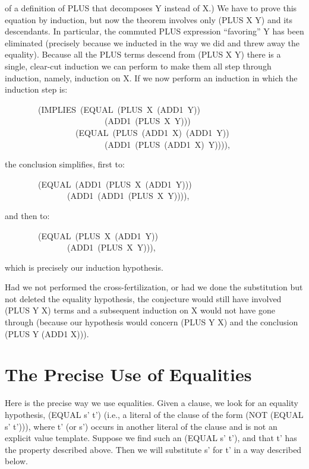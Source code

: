 \documentclass[11pt]{book}
\newenvironment{pubasis}{\begin{flushleft}\ttfamily\small}{\normalsize\rmfamily\end{flushleft}}
\newcommand{\pubdefaulttextsize}{\large}
\begin{document}
of a definition of PLUS that decomposes Y instead of X.)
We have to prove this equation by induction, but now the theorem  involves only
(PLUS X Y) and its descendants.  In particular, the commuted PLUS expression ``favoring'' Y
has been eliminated (precisely because we inducted in the way we did and threw
away the equality).
Because all the PLUS terms descend from (PLUS X Y) there is a single,
clear-cut induction we can perform to make them all step through
induction, namely, induction on X.  If we now
perform an induction in which the induction step is:
\begin{pubasis}
~~~~~~~~(IMPLIES~(EQUAL~(PLUS~X~(ADD1~Y))\\
~~~~~~~~~~~~~~~~~~~~~~~~(ADD1~(PLUS~X~Y)))\\
~~~~~~~~~~~~~~~~~(EQUAL~(PLUS~(ADD1~X)~(ADD1~Y))\\
~~~~~~~~~~~~~~~~~~~~~~~~(ADD1~(PLUS~(ADD1~X)~Y)))),\\
\end{pubasis}
the conclusion
simplifies, first to:
\begin{pubasis}
~~~~~~~~(EQUAL~(ADD1~(PLUS~X~(ADD1~Y)))\\
~~~~~~~~~~~~~~~(ADD1~(ADD1~(PLUS~X~Y)))),\\
\end{pubasis}
and then to:
\begin{pubasis}
~~~~~~~~(EQUAL~(PLUS~X~(ADD1~Y))\\
~~~~~~~~~~~~~~~(ADD1~(PLUS~X~Y))),\\
\end{pubasis}
which is precisely our induction hypothesis.

Had we not performed the cross-fertilization, or had we done the
substitution but not deleted the equality hypothesis, the
conjecture would  still have involved (PLUS Y X) terms and a subsequent
induction on X would not have gone through (because our hypothesis would
concern (PLUS Y X) and the conclusion (PLUS Y (ADD1 X))).
\section{The Precise Use of Equalities}
\pubdefaulttextsize
Here is the precise way we use equalities.
Given a clause, we look for an equality hypothesis, (EQUAL s' t') (i.e.,
a literal of the clause of the form (NOT (EQUAL s' t'))), where t' (or s')
occurs in another literal of the clause and is not an explicit value template.
Suppose we find such an (EQUAL s' t'), and that t' has the property described
above.  Then we will substitute s' for t' in a way described below.
\end{document}
